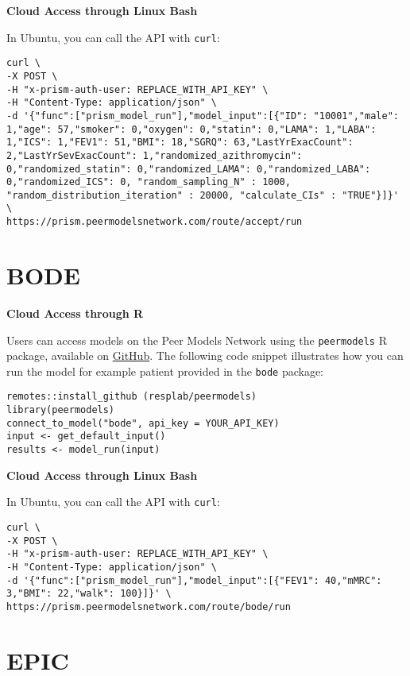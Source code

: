 \documentclass[
]{book}
\begin{document}
\textbf{Cloud Access through Linux Bash}

In Ubuntu, you can call the API with \texttt{curl}:

\begin{verbatim}
curl \
-X POST \
-H "x-prism-auth-user: REPLACE_WITH_API_KEY" \
-H "Content-Type: application/json" \
-d '{"func":["prism_model_run"],"model_input":[{"ID": "10001","male": 1,"age": 57,"smoker": 0,"oxygen": 0,"statin": 0,"LAMA": 1,"LABA": 1,"ICS": 1,"FEV1": 51,"BMI": 18,"SGRQ": 63,"LastYrExacCount": 2,"LastYrSevExacCount": 1,"randomized_azithromycin": 0,"randomized_statin": 0,"randomized_LAMA": 0,"randomized_LABA": 0,"randomized_ICS": 0, "random_sampling_N" : 1000, "random_distribution_iteration" : 20000, "calculate_CIs" : "TRUE"}]}' \
https://prism.peermodelsnetwork.com/route/accept/run
\end{verbatim}

\hypertarget{bode-1}{%
\section{BODE}\label{bode-1}}

\textbf{Cloud Access through R}

Users can access models on the Peer Models Network using the \texttt{peermodels} R package, available on \href{https://github.com/resplab/peermodels}{GitHub}. The following code snippet illustrates how you can run the model for example patient provided in the \texttt{bode} package:

\begin{verbatim}
remotes::install_github (resplab/peermodels)
library(peermodels)
connect_to_model("bode", api_key = YOUR_API_KEY)
input <- get_default_input()
results <- model_run(input)
\end{verbatim}

\textbf{Cloud Access through Linux Bash}

In Ubuntu, you can call the API with \texttt{curl}:

\begin{verbatim}
curl \
-X POST \
-H "x-prism-auth-user: REPLACE_WITH_API_KEY" \
-H "Content-Type: application/json" \
-d '{"func":["prism_model_run"],"model_input":[{"FEV1": 40,"mMRC": 3,"BMI": 22,"walk": 100}]}' \
https://prism.peermodelsnetwork.com/route/bode/run
\end{verbatim}

\hypertarget{epic-1}{%
\section{EPIC}\label{epic-1}}
\end{document}
